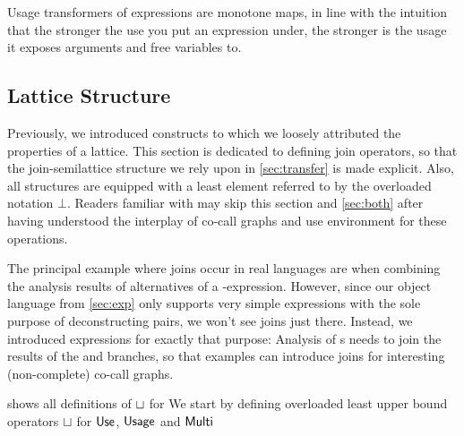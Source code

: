 Usage transformers of expressions are monotone maps, in line with the intuition that the stronger the use you put an expression under, the stronger is the usage it exposes arguments and free variables to.

\subsection{Lattice Structure}\label{sec:lattice}

Previously, we introduced constructs to which we loosely attributed the properties of a lattice. 
This section is dedicated to defining join operators, so that the join-semilattice structure we rely upon in \cref{sec:transfer} is made explicit.
Also, all structures are equipped with a least element referred to by the overloaded notation $\bot$.
Readers familiar with \textcite{card} may skip this section and \cref{sec:both} after having understood the interplay of co-call graphs and use environment for these operations.

The principal example where joins occur in real languages are when combining the analysis results of alternatives of a -expression. 
However, since our object language from \cref{sec:exp} only supports very simple  expressions with the sole purpose of deconstructing pairs, we won't see joins just there. 
Instead, we introduced  expressions for exactly that purpose: 
Analysis of s needs to join the results of the  and  branches, so that examples can introduce joins for interesting (\eg non-complete) co-call graphs.

 shows all definitions of $\sqcup$ for We start by defining overloaded least upper bound operators $\sqcup$ for $\text{\textsf{Use}}$, $\text{\textsf{Usage}}$ and $\text{\textsf{Multi}}$


